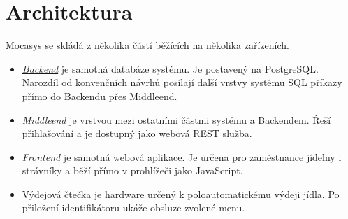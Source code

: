 
\chapter{Architektura} \label{architektura}


Mocasys se skládá z několika částí běžících na několika zařízeních.

\begin{itemize}
	\item \emph{\hyperref[backend]{Backend}} je samotná databáze systému. Je postavený na PostgreSQL.
	Narozdíl od konvenčních návrhů posílají další vrstvy systému SQL příkazy
	přímo do Backendu přes Middleend.
	
	\item \emph{\hyperref[middleend]{Middleend}} je vrstvou mezi ostatními částmi systému a Backendem.
	Řeší přihlašování a je dostupný jako webová REST služba.

	\item \emph{\hyperref[frontend]{Frontend}} je samotná webová aplikace. Je určena pro zaměstnance
	jídelny i strávníky a běží přímo v prohlížeči jako JavaScript.

	\item Výdejová čtečka je hardware určený k poloautomatickému výdeji
	jídla. Po přiložení identifikátoru ukáže obsluze zvolené menu.
\end{itemize}
